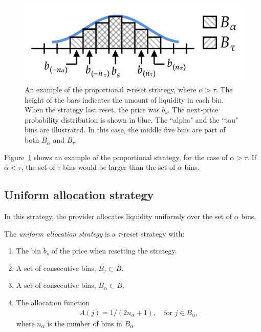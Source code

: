 \documentclass[sigconf, usenames, dvipsnames]{acmart}
\begin{document}
\begin{figure}
    \centering
    \includegraphics[width=\linewidth]{img/alpha_tau_ex.png}
    \caption{An example of the proportional $\tau$-reset strategy, where $\alpha > \tau$. The height of the bars indicates the amount of liquidity in each bin. When the strategy last reset, the  price was $b_s$. The next-price probability distribution is shown in blue. The ``alpha" and the ``tau" bins are illustrated. In this case, the middle five bins are part of both $B_{\alpha}$ and $B_{\tau}$.
    \label{fig:alpha_tau_ex}}
\end{figure}
Figure~\ref{fig:alpha_tau_ex} shows an example of the proportional strategy, for the case of $\alpha > \tau$. If $\alpha < \tau$, the set of $\tau$ bins would be larger than the set of $\alpha$ bins.

\subsection{Uniform allocation strategy}

In this strategy, the provider allocates liquidity uniformly over the set of $\alpha$ bins. 
\begin{definition}
The \textit{uniform allocation strategy} is a $\tau$-reset strategy with:
\begin{enumerate}
    \item The bin $b_s$ of the price when resetting the strategy.
    \item A set of consecutive bins, $B_{\tau} \subset B$.
    \item A set of consecutive bins, $B_{\alpha} \subset B$.
    \item The allocation function
    \begin{align}\label{eq:at_allocation}
        A(j) = 1 / (2n_{\alpha}+1), \quad \text{for } j\in B_{\alpha},
    \end{align}
    where $n_{\alpha}$ is the number of bins in $B_{\alpha}$.
\end{enumerate}
\end{definition}
\end{document}
